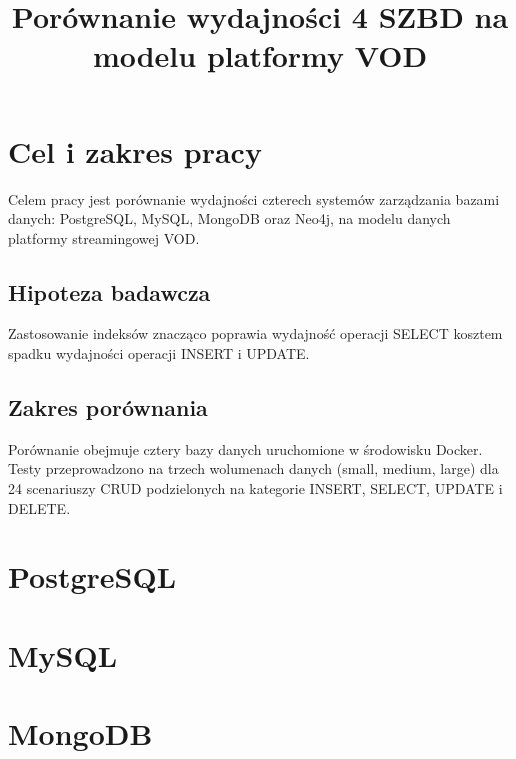 \documentclass{template}
\title{Porównanie wydajności 4 SZBD na modelu platformy VOD}
\begin{document}
\maketitle
{}
\setcounter{tocdepth}{2}
\tableofcontents
\clearpage
{}




\section{Cel i zakres pracy}
Celem pracy jest porównanie wydajności czterech systemów zarządzania bazami danych:
PostgreSQL, MySQL, MongoDB oraz Neo4j, na modelu danych platformy streamingowej VOD.

\subsection{Hipoteza badawcza}
Zastosowanie indeksów znacząco poprawia wydajność operacji SELECT kosztem
spadku wydajności operacji INSERT i UPDATE.

\subsection{Zakres porównania}
Porównanie obejmuje cztery bazy danych uruchomione w środowisku Docker. Testy przeprowadzono na trzech wolumenach
danych (small, medium, large) dla 24 scenariuszy CRUD podzielonych na
kategorie INSERT, SELECT, UPDATE i DELETE.

\section{PostgreSQL}



\section{MySQL}


\section{MongoDB}


\end{document}
